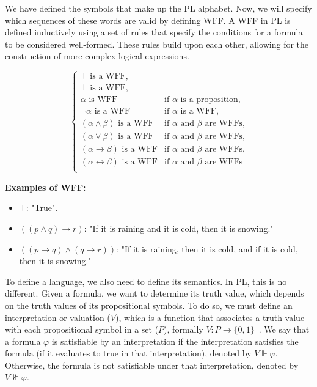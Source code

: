 We have defined the symbols that make up the \gls{PL} alphabet. Now, we will specify which sequences of these words are valid by defining \gls{WFF}. A \gls{WFF} in \gls{PL} is defined inductively using a set of rules that specify the conditions for a formula to be considered well-formed. These rules build upon each other, allowing for the construction of more complex logical expressions.

\[
\left\{
\begin{array}{ll}
\top \text{ is a WFF,}\\
\bot \text{ is a WFF,}\\
\alpha \text{ is WFF} & \text{if } \alpha \text{ is a proposition,}\\
\neg \alpha \text{ is a WFF} & \text{if } \alpha \text{ is a WFF,}\\
(\alpha \land \beta) \text{ is a WFF} & \text{if } \alpha \text{ and } \beta \text{ are WFFs,}\\
(\alpha \lor \beta) \text{ is a WFF} & \text{if } \alpha \text{ and } \beta \text{ are WFFs,} \\
(\alpha \rightarrow \beta) \text{ is a WFF} & \text{if } \alpha \text{ and } \beta \text{ are WFFs,} \\
(\alpha \leftrightarrow \beta) \text{ is a WFF} & \text{if } \alpha \text{ and } \beta \text{ are WFFs} \\
\end{array}
\right.
\]

\textbf{Examples of WFF:}
\begin{itemize}[itemsep=2pt]
    \renewcommand{\labelitemi}{}
    \item \(\top\): "True".
    \item \(((p \land q) \to r)\): "If it is raining and it is cold, then it is snowing."
    \item \(((p \to q) \land (q \to r))\): "If it is raining, then it is cold, and if it is cold, then it is snowing."
\end{itemize}

To define a language, we also need to define its semantics. In \gls{PL}, this is no different. Given a formula, we want to determine its truth value, which depends on the truth values of its propositional symbols. To do so, we must define an interpretation or valuation (\(V\)), which is a function that associates a truth value with each propositional symbol in a set (\(P\)), formally \(V: P \to \{0,1\}\)~\cite{gouveia_lgica}. We say that a formula \(\varphi\) is satisfiable by an interpretation if the interpretation satisfies the formula (if it evaluates to true in that interpretation), denoted by \(V \Vdash \varphi\). Otherwise, the formula is not satisfiable under that interpretation, denoted by \(V \nVDash \varphi\). 

